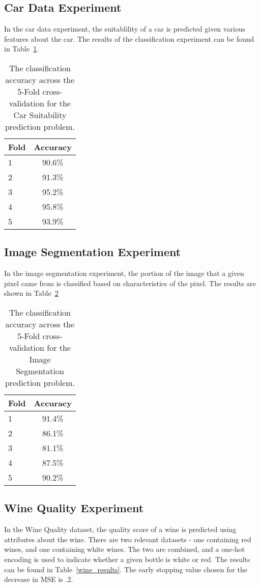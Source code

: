 \documentclass{amsart}
\begin{document}
    \subsection{Car Data Experiment}
    In the car data experiment, the suitablility of a car is predicted
    given various features about the car. The results of the classification
    experiment can be found in Table~\ref{car_results}.

    \begin{table}[H]
    \begin{tabular}{lc}
        Fold & Accuracy \\
        \hline
        1 & 90.6\% \\
        2 & 91.3\% \\
        3 & 95.2\% \\
        4 & 95.8\% \\
        5 & 93.9\%
    \end{tabular}
    \label{car_results}
    \caption{The classification accuracy across the 5-Fold cross-validation for the
    Car Suitability prediction problem.}
    \end{table}

    \subsection{Image Segmentation Experiment}
    In the image segmentation experiment\cite{image_dataset}, the portion of the image that
    a given pixel came from is classified based on characteristics
    of the pixel. The results are shown in Table~\ref{image_results}

    \begin{table}[H]
    \begin{tabular}{lc}
        Fold & Accuracy \\
        \hline
        1 & 91.4\% \\
        2 & 86.1\% \\
        3 & 81.1\% \\
        4 & 87.5\% \\
        5 & 90.2\%
    \end{tabular}
    \label{image_results}
    \caption{The classification accuracy across the 5-Fold cross-validation for the
    Image Segmentation prediction problem.}
    \end{table}

    \subsection{Wine Quality Experiment}
    In the Wine Quality dataset\cite{wine_quality}, the quality score of a
    wine is predicted using attributes about the wine. There are two
    relevant datasets - one containing red wines, and one containing white wines.
    The two are combined, and a one-hot encoding is used to indicate
    whether a given bottle is white or red. The results can be found in
    Table~\ref{wine_results}. The early stopping value chosen for the decrease
    in MSE is .2.
\end{document}
